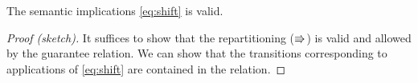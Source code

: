 

\begin{lemma}
  The semantic implications \eqref{eq:shift} is valid.
\end{lemma}
\begin{proof}[Proof (sketch)]
  It suffices to show that the repartitioning ($\Rrightarrow$) is valid
  and allowed by the guarantee relation. We can show that the transitions
  corresponding to applications of \eqref{eq:shift} are contained in
  the \shiftG relation.
\end{proof}


